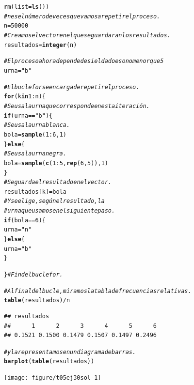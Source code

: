\documentclass[10pt,a4paper]{article}\usepackage[]{graphicx}\usepackage[]{color}
\makeatletter
\newcommand{\hlnum}[1]{\textcolor[rgb]{0.686,0.059,0.569}{#1}}%
\newcommand{\hlstr}[1]{\textcolor[rgb]{0.192,0.494,0.8}{#1}}%
\newcommand{\hlcom}[1]{\textcolor[rgb]{0.678,0.584,0.686}{\textit{#1}}}%
\newcommand{\hlopt}[1]{\textcolor[rgb]{0,0,0}{#1}}%
\newcommand{\hlstd}[1]{\textcolor[rgb]{0.345,0.345,0.345}{#1}}%
\newcommand{\hlkwa}[1]{\textcolor[rgb]{0.161,0.373,0.58}{\textbf{#1}}}%
\newcommand{\hlkwb}[1]{\textcolor[rgb]{0.69,0.353,0.396}{#1}}%
\newcommand{\hlkwc}[1]{\textcolor[rgb]{0.333,0.667,0.333}{#1}}%
\newcommand{\hlkwd}[1]{\textcolor[rgb]{0.737,0.353,0.396}{\textbf{#1}}}%
\newenvironment{kframe}{%
 \def\at@end@of@kframe{}%
 \ifinner\ifhmode%
  \def\at@end@of@kframe{\end{minipage}}%
  \begin{minipage}{\columnwidth}%
 \fi\fi%
 \def\FrameCommand##1{\hskip\@totalleftmargin \hskip-\fboxsep
 \colorbox{shadecolor}{##1}\hskip-\fboxsep
     \hskip-\linewidth \hskip-\@totalleftmargin \hskip\columnwidth}%
 \MakeFramed {\advance\hsize-\width
   \@totalleftmargin\z@ \linewidth\hsize
   \@setminipage}}%
 {\par\unskip\endMakeFramed%
 \at@end@of@kframe}
\newenvironment{knitrout}{}{} %
\makeatother
\begin{document}
\begin{knitrout}
\color{fgcolor}\begin{kframe}
\begin{alltt}
\hlkwd{rm}\hlstd{(}\hlkwc{list}\hlstd{=}\hlkwd{ls}\hlstd{())}
\hlcom{# n es el número de veces que vamos a repetir el proceso.}
\hlstd{n} \hlkwb{=} \hlnum{50000}
\hlcom{# Creamos el vector en el que se guardaran los resultados.}
\hlstd{resultados} \hlkwb{=} \hlkwd{integer}\hlstd{(n)}

\hlcom{# El proceso ahora depende de si el dado es o no menor que 5}
\hlstd{urna} \hlkwb{=} \hlstr{"b"}

\hlcom{# El bucle for se encarga de repetir el proceso.}
\hlkwa{for}\hlstd{(k} \hlkwa{in} \hlnum{1}\hlopt{:}\hlstd{n)\{}
    \hlcom{# Se usa la urna que corresponde en esta iteración.}
    \hlkwa{if}\hlstd{(urna} \hlopt{==} \hlstr{"b"}\hlstd{)\{}
        \hlcom{#Se usa la urna blanca.}
        \hlstd{bola} \hlkwb{=} \hlkwd{sample}\hlstd{(}\hlnum{1}\hlopt{:}\hlnum{6}\hlstd{,} \hlnum{1}\hlstd{)}
    \hlstd{\}} \hlkwa{else} \hlstd{\{}
        \hlcom{#Se usa la urna negra.}
        \hlstd{bola} \hlkwb{=} \hlkwd{sample}\hlstd{(}\hlkwd{c}\hlstd{(}\hlnum{1}\hlopt{:}\hlnum{5}\hlstd{,} \hlkwd{rep}\hlstd{(}\hlnum{6}\hlstd{,}\hlnum{5}\hlstd{)),} \hlnum{1}\hlstd{)}
    \hlstd{\}}
    \hlcom{# Se guarda el resultado en el vector.}
    \hlstd{resultados[k]} \hlkwb{=} \hlstd{bola}
    \hlcom{# Y se elige, según el resultado, la}
    \hlcom{# urna que usamos en el siguiente paso.}
    \hlkwa{if}\hlstd{(bola} \hlopt{==} \hlnum{6}\hlstd{)\{}
        \hlstd{urna} \hlkwb{=} \hlstr{"n"}
    \hlstd{\}} \hlkwa{else} \hlstd{\{}
        \hlstd{urna} \hlkwb{=} \hlstr{"b"}
    \hlstd{\}}

\hlstd{\}} \hlcom{# Fin del bucle for.}

\hlcom{# Al final del bucle, miramos la tabla de frecuencias relativas.}
\hlkwd{table}\hlstd{(resultados)} \hlopt{/} \hlstd{n}
\end{alltt}
\begin{verbatim}
## resultados
##      1      2      3      4      5      6 
## 0.1521 0.1500 0.1479 0.1507 0.1497 0.2496
\end{verbatim}
\begin{alltt}
\hlcom{# y la representamos en un diagrama de barras.}
\hlkwd{barplot}\hlstd{(}\hlkwd{table}\hlstd{(resultados))}
\end{alltt}
\end{kframe}
\texttt{[image: figure/t05ej30sol-1]} 

\end{knitrout}
\end{document}
